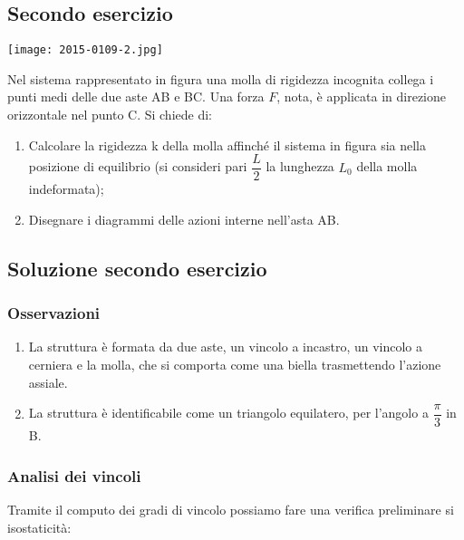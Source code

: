 \documentclass[main.tex]{subfiles}
\begin{document}
\subsection{Secondo esercizio}
\texttt{[image: 2015-0109-2.jpg]}

Nel sistema rappresentato in figura una molla di rigidezza incognita collega i punti medi delle due aste AB e BC. Una forza $F$, nota, è applicata in direzione orizzontale nel punto C. Si chiede di:

\begin{enumerate}
\item Calcolare la rigidezza k della molla affinché il sistema in figura sia nella posizione di equilibrio (si consideri pari $\dfrac{L}{2}$ la lunghezza $L_0$ della molla indeformata);
\item Disegnare i diagrammi delle azioni interne nell’asta AB.
\end{enumerate}

\clearpage

\subsection{Soluzione secondo esercizio}

\subsubsection{Osservazioni}

\begin{enumerate}
\item La struttura è formata da due aste, un vincolo a incastro, un vincolo a cerniera e la molla, che si comporta come una biella trasmettendo l'azione assiale.
\item La struttura è identificabile come un triangolo equilatero, per l'angolo  a $\dfrac{\pi}{3}$ in B.
\end{enumerate}

\subsubsection{Analisi dei vincoli}
Tramite il computo dei gradi di vincolo possiamo fare una verifica preliminare si isostaticità:
\end{document}
